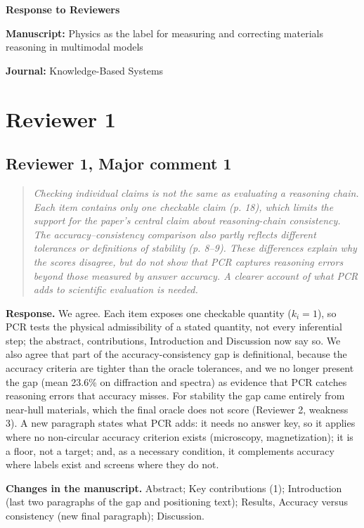 \documentclass[11pt,a4paper]{article}
\newenvironment{reviewer}{\begin{quote}\itshape\small}{\end{quote}}
\begin{document}
{\Large\bfseries Response to Reviewers}\par\medskip
\textbf{Manuscript:} Physics as the label for measuring and correcting materials reasoning in multimodal models\par
\textbf{Journal:} Knowledge-Based Systems\par\bigskip


\section*{Reviewer 1}

\subsection*{Reviewer 1, Major comment 1}

\begin{reviewer}Checking individual claims is not the same as evaluating a reasoning chain. Each item contains only one checkable claim (p. 18), which limits the support for the paper’s central claim about reasoning-chain consistency. The accuracy–consistency comparison also partly reflects different tolerances or definitions of stability (p. 8–9). These differences explain why the scores disagree, but do not show that PCR captures reasoning errors beyond those measured by answer accuracy. A clearer account of what PCR adds to scientific evaluation is needed.\end{reviewer}

\textbf{Response.} We agree. Each item exposes one checkable quantity ($k_i=1$), so PCR tests the physical admissibility of a stated quantity, not every inferential step; the abstract, contributions, Introduction and Discussion now say so. We also agree that part of the accuracy-consistency gap is definitional, because the accuracy criteria are tighter than the oracle tolerances, and we no longer present the gap (mean 23.6\% on diffraction and spectra) as evidence that PCR catches reasoning errors that accuracy misses. For stability the gap came entirely from near-hull materials, which the final oracle does not score (Reviewer 2, weakness 3). A new paragraph states what PCR adds: it needs no answer key, so it applies where no non-circular accuracy criterion exists (microscopy, magnetization); it is a floor, not a target; and, as a necessary condition, it complements accuracy where labels exist and screens where they do not.

\textbf{Changes in the manuscript.} Abstract; Key contributions (1); Introduction (last two paragraphs of the gap and positioning text); Results, Accuracy versus consistency (new final paragraph); Discussion.
\end{document}
